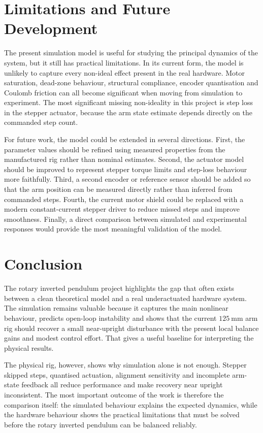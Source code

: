 \documentclass[conference]{IEEEtran}
\begin{document}
\section{Limitations and Future Development}
The present simulation model is useful for studying the principal dynamics of the system, but it still has practical limitations. In its current form, the model is unlikely to capture every non-ideal effect present in the real hardware. Motor saturation, dead-zone behaviour, structural compliance, encoder quantisation and Coulomb friction can all become significant when moving from simulation to experiment. The most significant missing non-ideality in this project is step loss in the stepper actuator, because the arm state estimate depends directly on the commanded step count.

For future work, the model could be extended in several directions. First, the parameter values should be refined using measured properties from the manufactured rig rather than nominal estimates. Second, the actuator model should be improved to represent stepper torque limits and step-loss behaviour more faithfully. Third, a second encoder or reference sensor should be added so that the arm position can be measured directly rather than inferred from commanded steps. Fourth, the current motor shield could be replaced with a modern constant-current stepper driver to reduce missed steps and improve smoothness. Finally, a direct comparison between simulated and experimental responses would provide the most meaningful validation of the model.

\section{Conclusion}
The rotary inverted pendulum project highlights the gap that often exists between a clean theoretical model and a real underactuated hardware system. The simulation remains valuable because it captures the main nonlinear behaviour, predicts open-loop instability and shows that the current $125~\mathrm{mm}$ arm rig should recover a small near-upright disturbance with the present local balance gains and modest control effort. That gives a useful baseline for interpreting the physical results.

The physical rig, however, shows why simulation alone is not enough. Stepper skipped steps, quantised actuation, alignment sensitivity and incomplete arm-state feedback all reduce performance and make recovery near upright inconsistent. The most important outcome of the work is therefore the comparison itself: the simulated behaviour explains the expected dynamics, while the hardware behaviour shows the practical limitations that must be solved before the rotary inverted pendulum can be balanced reliably.
\end{document}

